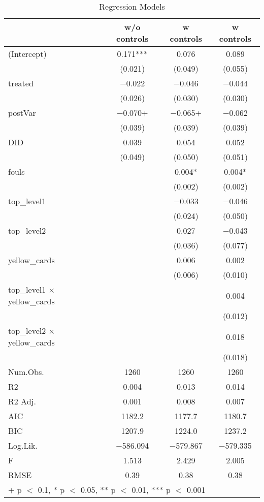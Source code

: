 \begin{table}

\caption{Regression Models}
\centering
\begin{tabular}[t]{lccc}
\toprule
  & w/o controls & w controls & w controls \\
\midrule
(Intercept) & \num{0.171}*** & \num{0.076} & \num{0.089}\\
 & (\num{0.021}) & (\num{0.049}) & (\num{0.055})\\
treated & \num{-0.022} & \num{-0.046} & \num{-0.044}\\
 & (\num{0.026}) & (\num{0.030}) & (\num{0.030})\\
postVar & \num{-0.070}+ & \num{-0.065}+ & \num{-0.062}\\
 & (\num{0.039}) & (\num{0.039}) & (\num{0.039})\\
DID & \num{0.039} & \num{0.054} & \num{0.052}\\
 & (\num{0.049}) & (\num{0.050}) & (\num{0.051})\\
fouls &  & \num{0.004}* & \num{0.004}*\\
 &  & (\num{0.002}) & (\num{0.002})\\
top\_level1 &  & \num{-0.033} & \num{-0.046}\\
 &  & (\num{0.024}) & (\num{0.050})\\
top\_level2 &  & \num{0.027} & \num{-0.043}\\
 &  & (\num{0.036}) & (\num{0.077})\\
yellow\_cards &  & \num{0.006} & \num{0.002}\\
 &  & (\num{0.006}) & (\num{0.010})\\
top\_level1 × yellow\_cards &  &  & \num{0.004}\\
 &  &  & (\num{0.012})\\
top\_level2 × yellow\_cards &  &  & \num{0.018}\\
 &  &  & (\num{0.018})\\
\midrule
Num.Obs. & \num{1260} & \num{1260} & \num{1260}\\
R2 & \num{0.004} & \num{0.013} & \num{0.014}\\
R2 Adj. & \num{0.001} & \num{0.008} & \num{0.007}\\
AIC & \num{1182.2} & \num{1177.7} & \num{1180.7}\\
BIC & \num{1207.9} & \num{1224.0} & \num{1237.2}\\
Log.Lik. & \num{-586.094} & \num{-579.867} & \num{-579.335}\\
F & \num{1.513} & \num{2.429} & \num{2.005}\\
RMSE & \num{0.39} & \num{0.38} & \num{0.38}\\
\bottomrule
\multicolumn{4}{l}{\rule{0pt}{1em}+ p $<$ 0.1, * p $<$ 0.05, ** p $<$ 0.01, *** p $<$ 0.001}\\
\end{tabular}
\end{table}
